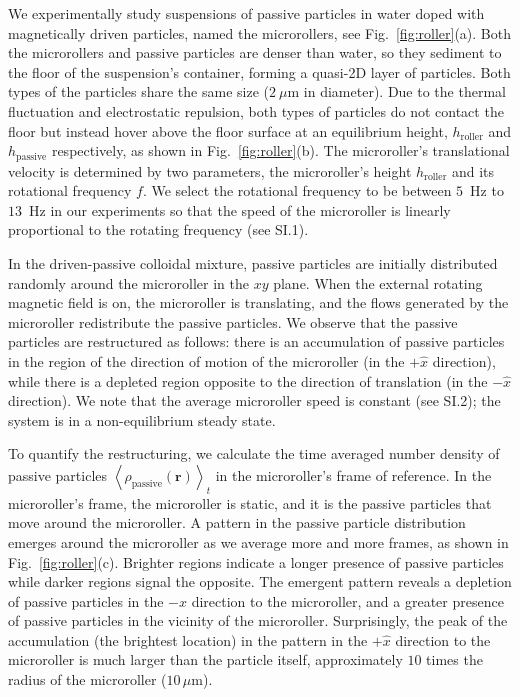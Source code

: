 \documentclass[12pt]{article}
\begin{document}
We experimentally study suspensions of passive particles in water doped with magnetically driven particles, named the microrollers, see Fig.~\ref{fig:roller}(a). 
% 
Both the microrollers and passive particles are denser than water, so they sediment to the floor of the suspension's container, forming a quasi-2D layer of particles. Both types of the particles share the same size ($2 \ \mu$m in diameter). Due to the thermal fluctuation and electrostatic repulsion, both types of particles do not contact the floor but instead hover above the floor surface at an equilibrium height, $h_{\mathrm{roller}}$ and $h_{\mathrm{passive}}$ respectively, as shown in Fig.~\ref{fig:roller}(b). 
%
The microroller's translational velocity is determined by two parameters, the microroller's height $h_\mathrm{roller}$ and its rotational frequency $f$. 
We select the rotational frequency to be between $5$~Hz to $13$~Hz in our experiments so that the speed of the microroller is linearly proportional to the rotating frequency (see SI.1). 

In the driven-passive colloidal mixture, passive particles are initially distributed randomly around the microroller in the $xy$ plane. 
When the external rotating magnetic field is on, the microroller is translating, and the flows generated by the microroller redistribute the passive particles. 
We observe that the passive particles are restructured as follows: there is an accumulation of passive particles in the region of the direction of motion of the microroller (in the $+\hat{x}$ direction), while there is a depleted region opposite to the direction of translation (in the $-\hat{x}$ direction). 
We note that the average microroller speed is constant (see SI.2); the system is in a non-equilibrium steady state.

To quantify the restructuring, we calculate the time averaged number density of passive particles $\left < \rho_{\mathrm{passive}}\left( \mathbf{r} \right) \right >_t$ in the microroller's frame of reference.
In the microroller's frame, the microroller is static, and it is the passive particles that move around the microroller.
A pattern in the passive particle distribution emerges around the microroller as we average more and more frames, as shown in Fig.~\ref{fig:roller}(c).
%
Brighter regions indicate a longer presence of passive particles while darker regions signal the opposite. The emergent pattern reveals a depletion of passive particles in the $-\hat{x}$ direction to the microroller, and a greater presence of passive particles in the vicinity of the microroller.
%
Surprisingly, the peak of the accumulation (the brightest location) in the pattern in the $+\hat{x}$ direction to the microroller is much larger than the particle itself, approximately $10$ times the radius of the microroller ($10 \, \mu \mathrm{m}$). 
\end{document}
